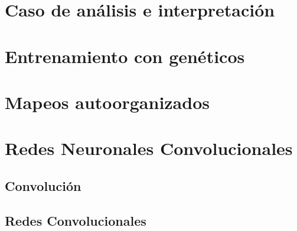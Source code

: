 \documentclass[12pt,openany]{book}
\begin{document}
\chapter{Caso de análisis e interpretación}



\chapter{Entrenamiento con genéticos}






\chapter{Mapeos autoorganizados}





\chapter{Redes Neuronales Convolucionales}
\section{Convolución}
\section{Redes Convolucionales}
\end{document}
